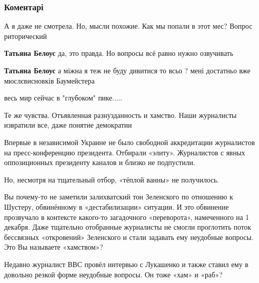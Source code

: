  
 
 
 
 
\subsubsection{Коментарі}

\begin{itemize} %
А я даже не смотрела. Но, мысли похожие. Как мы попали в этот мес? Вопрос риторический

\begin{itemize} %
\textbf{Татьяна Белоус} да, это правда. Но вопросы всё равно нужно озвучивать

\textbf{Татьяна Белоус} а міжна я теж не буду дивитися то всьо ? мені достатньо вже мюслєвисновків Баумейстера
\end{itemize} %

весь мир сейчас в "глубоком" пике.....


Те же чувства. Отъявленная разнузданность и хамство. Наши журналисты извратили все, даже понятие демократии


Впервые в независимой Украине не было свободной аккредитации журналистов на
пресс-конференцию президента. Отбирали «элиту». Журналистов с явных
оппозиционных президенту каналов и близко не подпустили.

Но, несмотря на тщательный отбор, «тёплой ванны» не получилось.

Вы почему-то не заметили залихватский тон Зеленского по отношению к Шустеру,
обвинённому в «дестабилизации» ситуации. И это обвинение прозвучало в контексте
какого-то загадочного «переворота», намеченного на 1 декабря. Даже тщательно
отобранные журналисты не смогли проглотить поток бессвязных «откровений»
Зеленского и стали задавать ему неудобные вопросы. Это Вы называете «хамством»?

Недавно журналист ВВС провёл интервью с Лукашенко и также ставил ему в довольно
резкой форме неудобные вопросы. Он тоже «хам» и «раб»?


\end{itemize}
